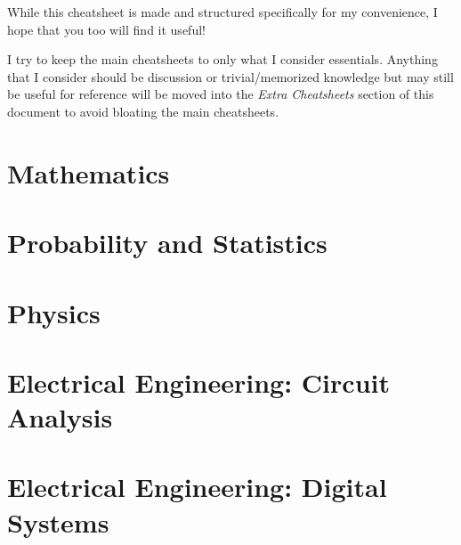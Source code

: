 \documentclass{article}
\begin{document}
\thispagestyle{plain}
\MakeCustomTitle
\bigskip

\medskip
While this cheatsheet is made and structured specifically for my convenience, I hope that you too will find it useful!

I try to keep the main cheatsheets to only what I consider essentials. Anything that I consider should be discussion or trivial/memorized knowledge but may still be useful for reference will be moved into the \textit{Extra Cheatsheets} section of this document to avoid bloating the main cheatsheets.
\medskip

{
    \hypersetup{linkcolor=black}
    \tableofcontents
}

\newpage
{}

\section{Mathematics}
\label{sec:mathgeneral}

    {  }

\newpage
\section{Probability and Statistics}
\label{sec:probability-and-statistics}

    {  }

\newpage
\section{Physics}
\label{sec:physics}

    {  }

\newpage
\section{Electrical Engineering: Circuit Analysis}
\label{sec:ee-circuit-analysis}

    {  }

\newpage
\section{Electrical Engineering: Digital Systems}
\label{sec:ee-digital}

    {  }
\end{document}
